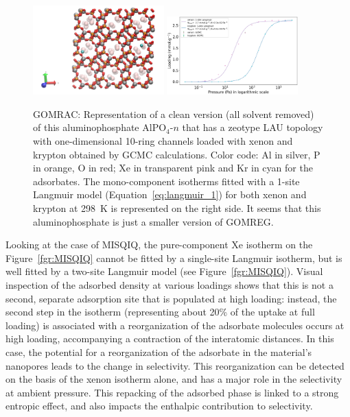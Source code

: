 \documentclass[main.tex]{subfiles}
\begin{document}
\begin{figure}[ht]
  \centering
    \includegraphics[width=0.45\textwidth]{figures/2-thermo/GOMRAC_clean.jpg}
    \includegraphics[width=0.45\textwidth]{figures/2-thermo/GOMRAC_clean_isotherm_xenon_krypton_298K.jpg}
    \caption{GOMRAC: Representation of a clean version (all solvent removed) of this aluminophosphate AlPO$_4$-$n$ that has a zeotype LAU topology with one-dimensional 10-ring channels loaded with xenon and krypton obtained by GCMC calculations. Color code: Al in silver, P in orange, O in red; Xe in transparent pink and Kr in cyan for the adsorbates. The mono-component isotherms fitted with a 1-site Langmuir model (Equation~\ref{eq:langmuir_1}) for both xenon and krypton at \SI{298}{\kelvin} is represented on the right side. It seems that this aluminophosphate is just a smaller version of GOMREG.}\label{fgr:SI:examples:GOMRAC}
  \end{figure}

Looking at the case of MISQIQ, the pure-component Xe isotherm on the Figure~\ref{fgr:MISQIQ} cannot be fitted by a single-site Langmuir isotherm, but is well fitted by a two-site Langmuir model (see Figure~\ref{fgr:MISQIQ}). Visual inspection of the adsorbed density at various loadings shows that this is not a second, separate adsorption site that is populated at high loading: instead, the second step in the isotherm (representing about {20\%} of the uptake at full loading) is associated with a reorganization of the adsorbate molecules occurs at high loading, accompanying a contraction of the interatomic distances. In this case, the potential for a reorganization of the adsorbate in the material's nanopores leads to the change in selectivity. This reorganization can be detected on the basis of the xenon isotherm alone, and has a major role in the selectivity at ambient pressure. This repacking of the adsorbed phase is linked to a strong entropic effect, and also impacts the enthalpic contribution to selectivity.
\end{document}
